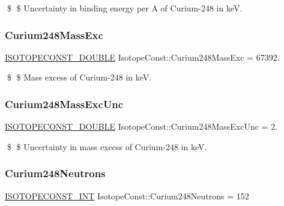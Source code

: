 \$ \$ Uncertainty in binding energy per A of Curium-\/248 in keV. \mbox{\label{group___isotope_const-_curium-_cm248_ga541197981e5e740f9a32ab3314e38ee0}} 
\subsubsection{\texorpdfstring{Curium248\+Mass\+Exc}{Curium248MassExc}}
{\footnotesize\ttfamily \mbox{\hyperlink{group___isotope_const-_macros_ga8f45a7272ce02c0b4c65c44636ed719a}{I\+S\+O\+T\+O\+P\+E\+C\+O\+N\+S\+T\+\_\+\+D\+O\+U\+B\+LE}} Isotope\+Const\+::\+Curium248\+Mass\+Exc = 67392.}

\$ \$ Mass excess of Curium-\/248 in keV. \mbox{\label{group___isotope_const-_curium-_cm248_ga2cecb9de93b2eefca7a70ea74cf057fb}} 
\subsubsection{\texorpdfstring{Curium248\+Mass\+Exc\+Unc}{Curium248MassExcUnc}}
{\footnotesize\ttfamily \mbox{\hyperlink{group___isotope_const-_macros_ga8f45a7272ce02c0b4c65c44636ed719a}{I\+S\+O\+T\+O\+P\+E\+C\+O\+N\+S\+T\+\_\+\+D\+O\+U\+B\+LE}} Isotope\+Const\+::\+Curium248\+Mass\+Exc\+Unc = 2.}

\$ \$ Uncertainty in mass excess of Curium-\/248 in keV. \mbox{\label{group___isotope_const-_curium-_cm248_ga33915ae88dd94379e1b0302700df36a7}} 
\subsubsection{\texorpdfstring{Curium248\+Neutrons}{Curium248Neutrons}}
{\footnotesize\ttfamily \mbox{\hyperlink{group___isotope_const-_macros_ga5f18360b3e99483a35c32d789e62621c}{I\+S\+O\+T\+O\+P\+E\+C\+O\+N\+S\+T\+\_\+\+I\+NT}} Isotope\+Const\+::\+Curium248\+Neutrons = 152}

